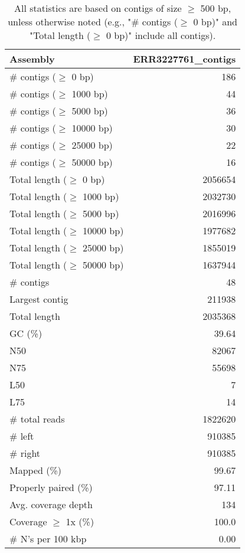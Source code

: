 \documentclass[12pt,a4paper]{article}
\begin{document}
\begin{table}[ht]
\begin{center}
\caption{All statistics are based on contigs of size $\geq$ 500 bp, unless otherwise noted (e.g., "\# contigs ($\geq$ 0 bp)" and "Total length ($\geq$ 0 bp)" include all contigs).}
\begin{tabular}{|l*{1}{|r}|}
\hline
Assembly & ERR3227761\_contigs \\ \hline
\# contigs ($\geq$ 0 bp) & 186 \\ \hline
\# contigs ($\geq$ 1000 bp) & 44 \\ \hline
\# contigs ($\geq$ 5000 bp) & 36 \\ \hline
\# contigs ($\geq$ 10000 bp) & 30 \\ \hline
\# contigs ($\geq$ 25000 bp) & 22 \\ \hline
\# contigs ($\geq$ 50000 bp) & 16 \\ \hline
Total length ($\geq$ 0 bp) & 2056654 \\ \hline
Total length ($\geq$ 1000 bp) & 2032730 \\ \hline
Total length ($\geq$ 5000 bp) & 2016996 \\ \hline
Total length ($\geq$ 10000 bp) & 1977682 \\ \hline
Total length ($\geq$ 25000 bp) & 1855019 \\ \hline
Total length ($\geq$ 50000 bp) & 1637944 \\ \hline
\# contigs & 48 \\ \hline
Largest contig & 211938 \\ \hline
Total length & 2035368 \\ \hline
GC (\%) & 39.64 \\ \hline
N50 & 82067 \\ \hline
N75 & 55698 \\ \hline
L50 & 7 \\ \hline
L75 & 14 \\ \hline
\# total reads & 1822620 \\ \hline
\# left & 910385 \\ \hline
\# right & 910385 \\ \hline
Mapped (\%) & 99.67 \\ \hline
Properly paired (\%) & 97.11 \\ \hline
Avg. coverage depth & 134 \\ \hline
Coverage $\geq$ 1x (\%) & 100.0 \\ \hline
\# N's per 100 kbp & 0.00 \\ \hline
\end{tabular}
\end{center}
\end{table}
\end{document}
